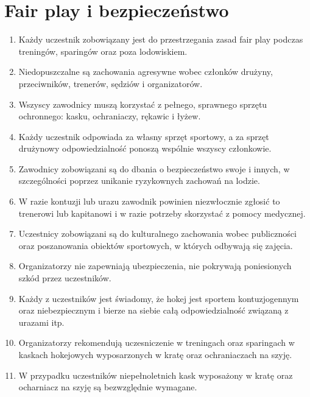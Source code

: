 \documentclass[12pt,a4paper]{article}
\let\stdsection\section
\renewcommand\section{\clearpage\stdsection}
\begin{document}
\section{Fair play i bezpieczeństwo}
\begin{enumerate}
  \item Każdy uczestnik zobowiązany jest do przestrzegania zasad fair play podczas treningów, sparingów oraz poza lodowiskiem.
  \item Niedopuszczalne są zachowania agresywne wobec członków drużyny, przeciwników, trenerów, sędziów i organizatorów.
  \item Wszyscy zawodnicy muszą korzystać z pełnego, sprawnego sprzętu ochronnego: kasku, ochraniaczy, rękawic i łyżew.
  \item Każdy uczestnik odpowiada za własny sprzęt sportowy, a za sprzęt drużynowy odpowiedzialność ponoszą wspólnie wszyscy członkowie.
  \item Zawodnicy zobowiązani są do dbania o bezpieczeństwo swoje i innych, w szczególności poprzez unikanie ryzykownych zachowań na lodzie.
  \item W razie kontuzji lub urazu zawodnik powinien niezwłocznie zgłosić to trenerowi lub kapitanowi i w razie potrzeby skorzystać z pomocy medycznej.
  \item Uczestnicy zobowiązani są do kulturalnego zachowania wobec publiczności oraz poszanowania obiektów sportowych, w których odbywają się zajęcia.
  \item Organizatorzy nie zapewniają ubezpieczenia, nie pokrywają poniesionych szkód przez uczestników.
  \item Każdy z uczestników jest świadomy, że hokej jest sportem kontuzjogennym oraz niebezpiecznym i bierze na siebie całą odpowiedzialność związaną z urazami itp.
  \item Organizatorzy rekomendują uczesniczenie w treningach oraz sparingach w kaskach hokejowych wyposarzonych w kratę oraz ochraniaczach na szyję.
  \item W przypadku uczestników niepełnoletnich kask wyposażony w kratę oraz ocharniacz na szyję są bezwzględnie wymagane.
\end{enumerate}
\end{document}
